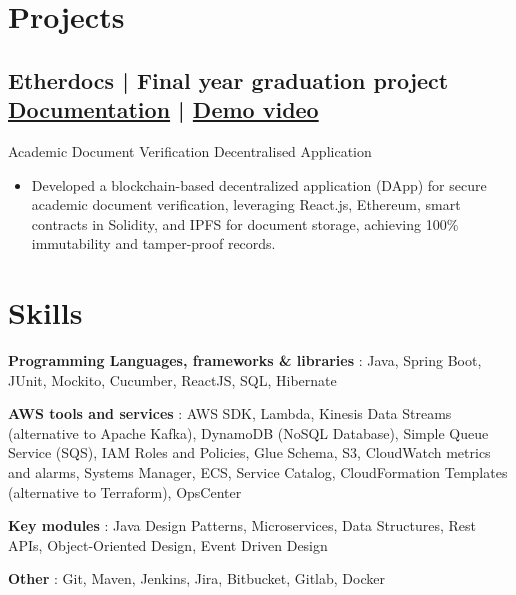 \documentclass[a4,10pt]{article}
\newcommand{\subtext}[1]{
#1\par\vspace{-0.2cm}}
\newenvironment{zitemize}{
\begin{itemize}\itemsep0pt \parskip0pt \parsep1pt}
{\end{itemize}\vspace{-0.5cm}}
\newcommand{\hskills}[1]{
\textbf{\bfseries #1} }
\begin{document}
\vspace{-10pt}
\section*{Projects} 

\subsection*{Etherdocs | Final year graduation project \hfill {\href{https://github.com/DevelopersLeague/EtherDocs/blob/main/Readme.md}{Documentation}} | {\href{https://youtu.be/B_44aJ9hh6U?si=dGItpsQ3AEo_eIxk}{Demo video}}}
\subtext{{\normalsize\normalfont Academic Document Verification Decentralised Application}}
\begin{zitemize}
    \item Developed a blockchain-based decentralized application (DApp) for secure academic document verification, leveraging React.js, Ethereum, smart contracts in Solidity, and IPFS for document storage, achieving 100\% immutability and tamper-proof records.
\end{zitemize}


\section{Skills}

\hskills{Programming Languages, frameworks \& libraries}: Java, Spring Boot, JUnit, Mockito, Cucumber, ReactJS, SQL, Hibernate

\hskills{AWS tools and services}: AWS SDK, Lambda, Kinesis Data Streams (alternative to Apache Kafka), DynamoDB (NoSQL Database), Simple Queue Service (SQS), IAM Roles and Policies, Glue Schema, S3, CloudWatch metrics and alarms, Systems Manager, ECS, Service Catalog, CloudFormation Templates (alternative to Terraform), OpsCenter

\hskills{Key modules}: Java Design Patterns, Microservices, Data Structures, Rest APIs, Object-Oriented Design, Event Driven Design

\hskills{Other}: Git, Maven, Jenkins, Jira, Bitbucket, Gitlab, Docker     
\end{document}
